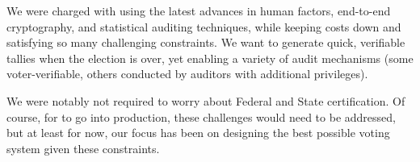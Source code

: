 We were charged with using the latest advances in human factors,
end-to-end cryptography, and statistical auditing techniques, while
keeping costs down and satisfying so many challenging constraints.
We want to generate quick, verifiable tallies when the election is
over, yet enabling a variety of audit mechanisms (some
voter-verifiable, others conducted by auditors with additional
privileges). 

We were notably not required to worry about Federal and State
certification. Of course, for \projname to go into production, these
challenges would need to be addressed, but at least for now, our focus
has been on designing the best possible voting system given these
constraints.

